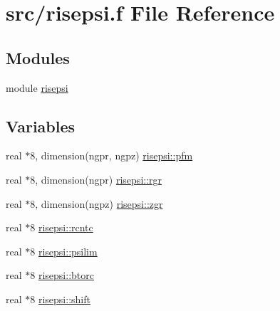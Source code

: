 \hypertarget{risepsi_8f}{
\section{src/risepsi.f File Reference}
\label{risepsi_8f}
}
\subsection*{Modules}
\begin{CompactItemize}
\item 
module \hyperlink{namespacerisepsi}{risepsi}
\end{CompactItemize}
\subsection*{Variables}
\begin{CompactItemize}
\item 
real $\ast$8, dimension(ngpr, ngpz) \hyperlink{namespacerisepsi_abc0a1f2c2e97d9f2250a5ceb4116208}{risepsi::pfm}
\item 
real $\ast$8, dimension(ngpr) \hyperlink{namespacerisepsi_2c87a7df84e82267048de20d41dc8f2c}{risepsi::rgr}
\item 
real $\ast$8, dimension(ngpz) \hyperlink{namespacerisepsi_0634f432b4995d66062308d5613c7fc5}{risepsi::zgr}
\item 
real $\ast$8 \hyperlink{namespacerisepsi_efd32323d70597b7c7826a19774b96c7}{risepsi::rcntc}
\item 
real $\ast$8 \hyperlink{namespacerisepsi_8284737207616a8fb7b5c049b96f2892}{risepsi::psilim}
\item 
real $\ast$8 \hyperlink{namespacerisepsi_5df6cf4ba10c7c733c5390d311df12e1}{risepsi::btorc}
\item 
real $\ast$8 \hyperlink{namespacerisepsi_436baf8e4903206b7958c1ce68f457e1}{risepsi::shift}
\end{CompactItemize}
